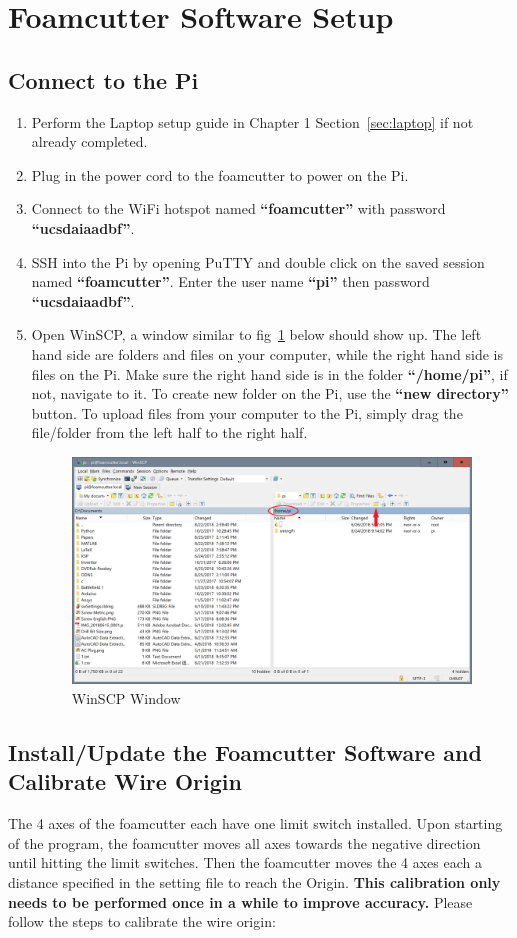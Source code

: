 \documentclass[titlepage,12pt,letter]{report}
\numberwithin{equation}{chapter}
\begin{document}
\section{Foamcutter Software Setup}
\subsection{Connect to the Pi}
\begin{enumerate}[itemsep = 5pt,topsep=0pt]
	\item Perform the Laptop setup guide in Chapter 1 Section~\ref{sec:laptop} if not already completed.
	\item Plug in the power cord to the foamcutter to power on the Pi.
	\item Connect to the WiFi hotspot named \textbf{``foamcutter''} with password \textbf{``ucsdaiaadbf''}.
	\item SSH into the Pi by opening PuTTY and double click on the saved session named \textbf{``foamcutter''}. Enter the user name \textbf{``pi''} then password \textbf{``ucsdaiaadbf''}.
	\item Open WinSCP, a window similar to fig~\ref{fig:winscp} below should show up. The left hand side are folders and files on your computer, while the right hand side is files on the Pi. Make sure the right hand side is in the folder \textbf{``/home/pi''}, if not, navigate to it. To create new folder on the Pi, use the \textbf{``new directory''} button. To upload files from your computer to the Pi, simply drag the file/folder from the left half to the right half. 
	\begin{figure} [H]
		\includegraphics[width = 0.9\linewidth]{./Figures/winscp.png}
		\caption{WinSCP Window}
		\label{fig:winscp}
	\end{figure}
\end{enumerate}

\subsection{Install/Update the Foamcutter Software and Calibrate Wire Origin}
\label{sec:calibration}
The 4 axes of the foamcutter each have one limit switch installed. Upon starting of the program, the foamcutter moves all axes towards the negative direction until hitting the limit switches. Then the foamcutter moves the 4 axes each a distance specified in the setting file to reach the Origin. \textbf{This calibration only needs to be performed once in a while to improve accuracy.} Please follow the  steps to calibrate the wire origin:
\end{document}
